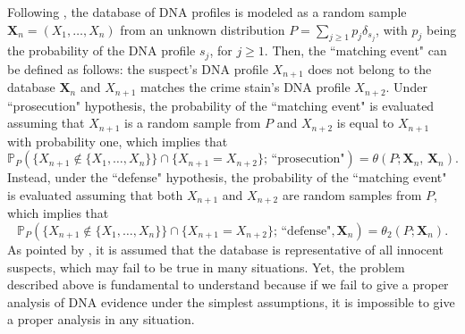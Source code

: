\documentclass{article}
\newcommand{\1}{\boldsymbol{1}}
\theoremstyle{plain}
\begin{document}
Following  \cite{Bre(10)}, the database of DNA profiles is modeled as a random sample $\mathbf{X}_{n}=(X_{1},\ldots,X_{n})$ from an unknown distribution $P=\sum_{j\geq1}p_{j}\delta_{s_{j}}$, with $p_{j}$ being the probability of the DNA profile $s_{j}$, for $j\geq1$. Then, the ``matching event" can be defined as follows: the suspect's DNA profile $X_{n+1}$ does not belong to the database $\mathbf{X}_{n}$ and $X_{n+1}$ matches the crime stain's DNA profile $X_{n+2}$. Under ``prosecution" hypothesis, the probability of the ``matching event" is evaluated assuming that $X_{n+1}$ is a random sample from $P$ and $X_{n+2}$ is equal to $X_{n+1}$ with probability one, which implies that
\begin{equation}\label{prob_p}
\mathbb{P}_{P}(\{X_{n+1}\notin\{X_{1},\ldots,X_{n}\}\}\cap\{X_{n+1}=X_{n+2}\};\,\text{``prosecution"})=\theta(P;\mathbf{X}_{n},\, \mathbf{X}_n).
\end{equation}
Instead, under the ``defense" hypothesis, the probability of the ``matching event" is evaluated assuming that both $X_{n+1}$ and $X_{n+2}$ are random samples from $P$, which implies that
\begin{equation}\label{prob_d}
\mathbb{P}_{P}(\{X_{n+1}\notin\{X_{1},\ldots,X_{n}\}\}\cap\{X_{n+1}=X_{n+2}\};\,\text{``defense"},\mathbf{X}_n)=\theta_{2}(P;\mathbf{X}_{n}).
\end{equation}
As pointed by \cite{Bre(10)}, it is assumed that the database is representative of all innocent suspects, which may fail to be true
in many situations. Yet, the problem described above is fundamental to understand because if we fail to give a proper analysis of DNA evidence under the simplest assumptions, it is impossible to give a proper analysis in any situation.
\end{document}
